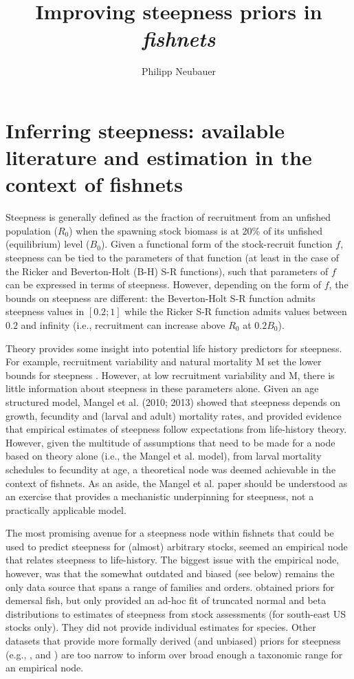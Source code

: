 \documentclass{dragonfly-report}\usepackage[]{graphicx}\usepackage[]{color}
\title{Improving steepness priors in \emph{fishnets}}{Improving
  priors for the steepness of the stock-recruitment function within the R package \emph{fishnets}}
\subtitle{}
\author{Philipp Neubauer}
\begin{document}
\maketitle

\section{Inferring steepness: available literature and estimation in the context of fishnets}

Steepness is generally defined as the fraction of recruitment from an unfished population ($R_0$) when the spawning stock biomass is at 20\% of its unfished (equilibrium) level ($B_0$). Given a functional form of the stock-recruit function $f$, steepness can be tied to the parameters of that function (at least in the case of the Ricker and Beverton-Holt (B-H) S-R functions), such that parameters of $f$ can be expressed in terms of steepness. However, depending on the form of $f$, the bounds on steepness are different: the Beverton-Holt S-R function admits steepness values in $[0.2;1]$ while the Ricker S-R function admits values between $0.2$ and infinity (i.e., recruitment can increase above $R_0$ at $0.2 B_0$). 

Theory provides some insight into potential life history predictors for steepness. For example, recruitment variability and natural mortality M set the lower bounds for steepness \citep{he_2006_prior}. However, at low recruitment variability and M, there is little information about steepness in these parameters alone. Given an age structured model, Mangel et al. (2010; 2013) showed that steepness depends on growth, fecundity and (larval and adult) mortality rates, and \citet{rose2001compensatory} provided evidence that empirical estimates of steepness follow expectations from life-history theory. However, given the multitude of assumptions that need to be made for a node based on theory alone (i.e., the Mangel et al. model), from larval mortality schedules to fecundity at age, a theoretical node was deemed achievable in the context of fishnets. As an aside, the Mangel et al. paper should be understood as an exercise that provides a mechanistic underpinning for steepness, not a practically applicable model. 

The most promising avenue for a steepness node within fishnets that could be used to predict steepness for (almost) arbitrary stocks, seemed an empirical node that relates steepness to life-history. The biggest issue with the empirical node, however, was that the somewhat outdated and biased (see below) \citet{myers_1999_maximum} remains the only data source that spans a range of families and orders. \citet{shertzer2012spawner} obtained priors for demersal fish, but only provided an ad-hoc fit of truncated normal and beta distributions to estimates of steepness from stock assessments (for south-east US stocks only). They did not provide individual estimates for species. Other datasets that provide more formally derived (and unbiased) priors for steepness (e.g., \citet{michielsens_2004_bayesian}, \citet{dorn2002advice} and \citet{forrest2010hierarchical}) are too narrow to inform over broad enough a taxonomic range for an empirical node.
\end{document}
